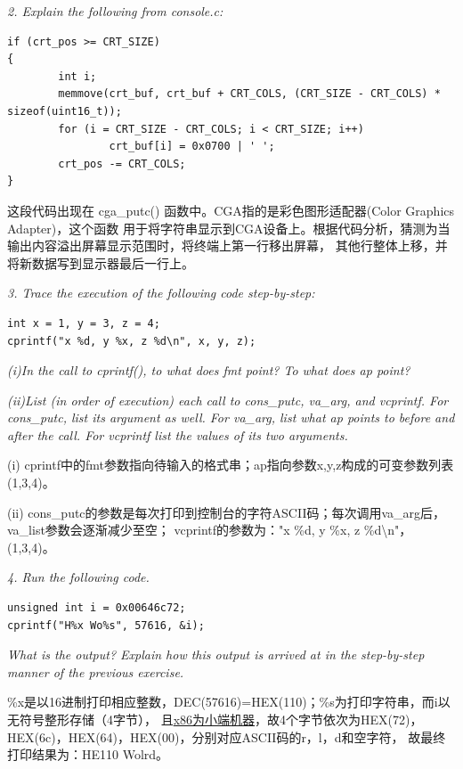 \documentclass[12pt, letterpaper]{report}
\begin{document}
\textsl{2. Explain the following from console.c:} \par
\lstset{style=CStyle}
\setmainfont{Consolas}
\begin{lstlisting}
if (crt_pos >= CRT_SIZE) 
{
        int i;
        memmove(crt_buf, crt_buf + CRT_COLS, (CRT_SIZE - CRT_COLS) * sizeof(uint16_t));
        for (i = CRT_SIZE - CRT_COLS; i < CRT_SIZE; i++)
                crt_buf[i] = 0x0700 | ' ';
        crt_pos -= CRT_COLS;
}
\end{lstlisting}
\setmainfont{Times New Roman} \par
这段代码出现在 cga\_putc() 函数中。CGA指的是彩色图形适配器(Color Graphics Adapter)，这个函数
用于将字符串显示到CGA设备上。根据代码分析，猜测为当输出内容溢出屏幕显示范围时，将终端上第一行移出屏幕，
其他行整体上移，并将新数据写到显示器最后一行上。 \par 
\quad \par 
\quad \par

\textsl{3. Trace the execution of the following code step-by-step:} \par
\lstset{style=CStyle}
\setmainfont{Consolas}
\begin{lstlisting}
int x = 1, y = 3, z = 4;
cprintf("x %d, y %x, z %d\n", x, y, z);
\end{lstlisting}
\setmainfont{Times New Roman}
\quad \quad
\textsl{(i)In the call to cprintf(), to what does fmt point? To what does ap point?} \par 
\textsl{(ii)List (in order of execution) each call to cons\_putc, va\_arg, and vcprintf. 
        For cons\_putc, list its argument as well. For va\_arg, list what ap points to before and after the call. 
        For vcprintf list the values of its two arguments.} \par
\quad \par 
(i) cprintf中的fmt参数指向待输入的格式串；ap指向参数x,y,z构成的可变参数列表(1,3,4)。\par 
(ii) cons\_putc的参数是每次打印到控制台的字符ASCII码；每次调用va\_arg后，va\_list参数会逐渐减少至空；
     vcprintf的参数为："x \%d, y \%x, z \%d\textbackslash n"，(1,3,4)。\par
\quad \par 


\textsl{4. Run the following code.} \par
\lstset{style=CStyle}
\setmainfont{Consolas}
\begin{lstlisting}
unsigned int i = 0x00646c72;
cprintf("H%x Wo%s", 57616, &i);
\end{lstlisting}
\setmainfont{Times New Roman}
\quad \quad
\textsl{What is the output? Explain how this output 
        is arrived at in the step-by-step manner of the previous exercise.} \par 
\quad \par 
\%x是以16进制打印相应整数，DEC(57616)=HEX(110)；\%s为打印字符串，而i以无符号整形存储（4字节），
且\underline{x86为小端机器}，故4个字节依次为HEX(72)，HEX(6c)，HEX(64)，HEX(00)，分别对应ASCII码的r，l，d和空字符，
故最终打印结果为：HE110 Wolrd。\par 
\quad \par
\end{document}
